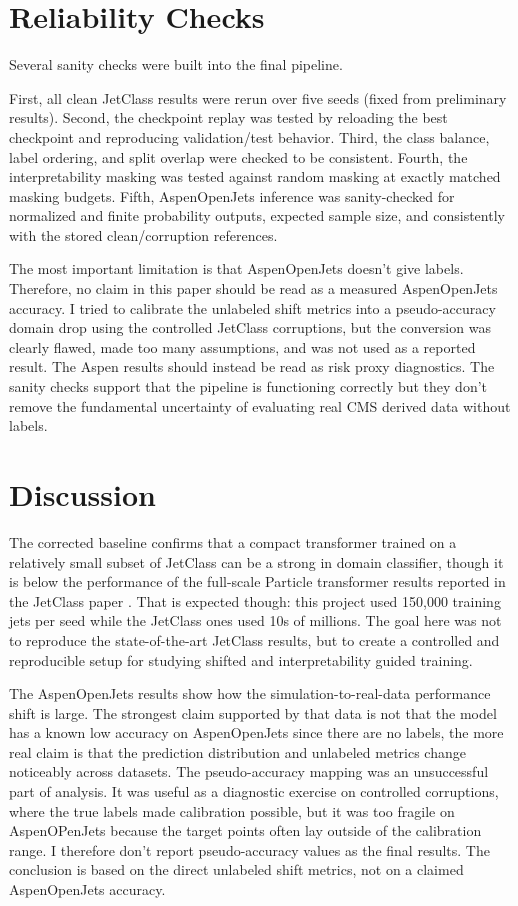 \documentclass[11pt]{article}
\begin{document}
\section{Reliability Checks}

Several sanity checks were built into the final pipeline. 

First, all clean JetClass results were rerun over five seeds (fixed from preliminary results). Second, the checkpoint replay was tested by reloading the best checkpoint and reproducing validation/test behavior. Third, the class balance, label ordering, and split overlap were checked to be consistent. Fourth, the interpretability masking was tested against random masking at exactly matched masking budgets. Fifth, AspenOpenJets inference was sanity-checked for normalized and finite probability outputs, expected sample size, and consistently with the stored clean/corruption references.

The most important limitation is that AspenOpenJets doesn’t give labels. Therefore, no claim in this paper should be read as a measured AspenOpenJets accuracy. I tried to calibrate the unlabeled shift metrics into a pseudo-accuracy domain drop using the controlled JetClass corruptions, but the conversion was clearly flawed, made too many assumptions, and was not used as a reported result. The Aspen results should instead be read as risk proxy diagnostics. The sanity checks support that the pipeline is functioning correctly but they don’t remove the fundamental uncertainty of evaluating real CMS derived data without labels.




\section{Discussion}

The corrected baseline confirms that a compact transformer trained on a relatively small subset of JetClass can be a strong in domain classifier, though it is below the performance of the full-scale Particle transformer results reported in the JetClass paper \cite{qu2022particle}. That is expected though: this project used 150,000 training jets per seed while the JetClass ones used 10s of millions. The goal here was not to reproduce the state-of-the-art JetClass results, but to create a controlled and reproducible setup for studying shifted and interpretability guided training.

The AspenOpenJets results show how the simulation-to-real-data performance shift is large. The strongest claim supported by that data is not that the model has a known low accuracy on AspenOpenJets since there are no labels, the more real claim is that the prediction distribution and unlabeled metrics change noticeably across datasets. The pseudo-accuracy mapping was an unsuccessful part of analysis. It was useful as a diagnostic exercise on controlled corruptions, where the true labels made calibration possible, but it was too fragile on AspenOPenJets because the target points often lay outside of the calibration range. I therefore don’t report pseudo-accuracy values as the final results. The conclusion is based on the direct unlabeled shift metrics, not on a claimed AspenOpenJets accuracy.
\end{document}
